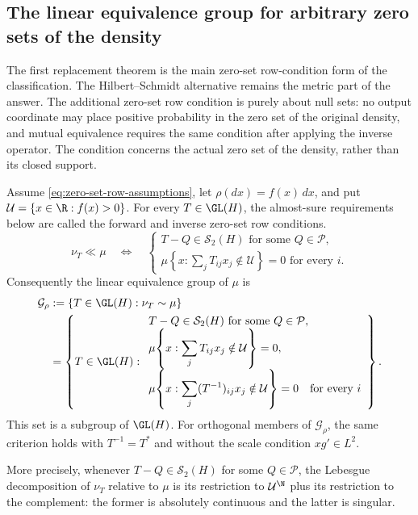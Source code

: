 \subsection{The linear equivalence group for arbitrary zero sets of the density}
\label{sec:linear-equivalence-group}

The first replacement theorem is the main zero-set row-condition form of the
classification.
The Hilbert--Schmidt alternative remains the metric part of the answer.
The additional zero-set row condition is purely about null sets: no output coordinate may place
positive probability in the zero set of the original density, and mutual
equivalence requires the same condition after applying the inverse operator.
The condition concerns the actual zero set of the density, rather than its
closed support.

\begin{theorem}
\label{thm:linear-equivalence-group}
Assume \eqref{eq:zero-set-row-assumptions}, let $\rho(dx)=f(x)\,dx$, and put
$\mathcal U=\{x\in\R:f(x)>0\}$.  For every $T\in\GL(H)$,
the almost-sure requirements below are called the forward and inverse
zero-set row conditions.
\begin{equation}
 \nu_T\ll\mu
 \quad\Longleftrightarrow\quad
 \begin{cases}
 T-Q\in\mathcal S_2(H)\text{ for some }Q\in\mathcal P,\\
 \displaystyle
 \mu\!\left\{x:\sum_jT_{ij}x_j\notin\mathcal U\right\}=0
       \text{ for every }i.
 \end{cases}
 \label{eq:absolute-continuity-operator-criterion}
\end{equation}
Consequently the linear equivalence group of $\mu$ is
\begin{equation}
 \begin{aligned}
 \mathcal G_\rho
 &:=\{T\in\GL(H):\nu_T\sim\mu\}\\
 &=\left\{T\in\GL(H):
 \begin{array}{l}
 T-Q\in\mathcal S_2(H)\text{ for some }Q\in\mathcal P,\\
 \displaystyle\mu\!\left\{x:\sum_jT_{ij}x_j\notin\mathcal U\right\}=0,\\
 \displaystyle\mu\!\left\{x:\sum_j(T^{-1})_{ij}x_j\notin\mathcal U\right\}=0
       \quad\text{for every }i
 \end{array}\right\}.
 \end{aligned}
 \label{eq:linear-equivalence-group}
\end{equation}
This set is a subgroup of $\GL(H)$.  For orthogonal members of
$\mathcal G_\rho$, the same criterion holds with $T^{-1}=T^*$
and without the scale condition $xg'\in L^2$.

More precisely, whenever $T-Q\in\mathcal S_2(H)$ for some
$Q\in\mathcal P$, the Lebesgue decomposition of $\nu_T$ relative to
$\mu$ is its restriction to $\mathcal U^{\N}$ plus its restriction
to the complement: the former is absolutely continuous and the latter
is singular.
\end{theorem}

